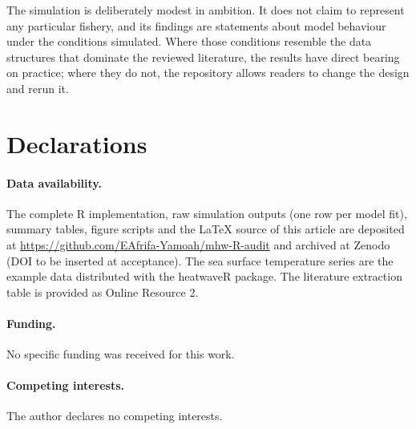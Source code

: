 \documentclass[12pt,a4paper]{article}
\begin{document}
The simulation is deliberately modest in ambition. It does not claim to represent any particular fishery, and its findings are statements about model behaviour under the conditions simulated. Where those conditions resemble the data structures that dominate the reviewed literature, the results have direct bearing on practice; where they do not, the repository allows readers to change the design and rerun it.






\section*{Declarations}
\paragraph{Data availability.} The complete R implementation, raw simulation outputs (one row per model fit), summary tables, figure scripts and the LaTeX source of this article are deposited at \url{https://github.com/EAfrifa-Yamoah/mhw-R-audit} and archived at Zenodo (DOI to be inserted at acceptance). The sea surface temperature series are the example data distributed with the heatwaveR package. The literature extraction table is provided as Online Resource 2.
\paragraph{Funding.} No specific funding was received for this work.
\paragraph{Competing interests.} The author declares no competing interests.


\end{document}
